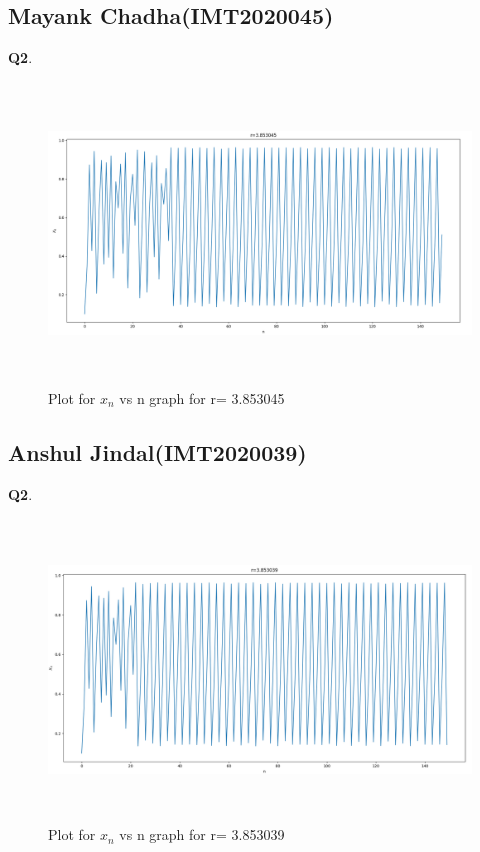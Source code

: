 \documentclass[11pt]{scrartcl} %
\begin{document}
\subsection{Mayank Chadha(IMT2020045)}
\textbf{Q2}.
\begin{figure}[h] %
	\centering
	\includegraphics[width=12cm, height=8cm]{Mayank.png} %
	\caption {Plot for $x_n$ vs n graph for r= 3.853045}
\end{figure}
\subsection{Anshul Jindal(IMT2020039)}
\textbf{Q2}.
\begin{figure}[h] %
	\centering
	\includegraphics[width=12cm, height=8cm]{anshul_bsdk.png} %
	\caption {Plot for $x_n$ vs n graph for r= 3.853039}
\end{figure}
\newpage
\end{document}
